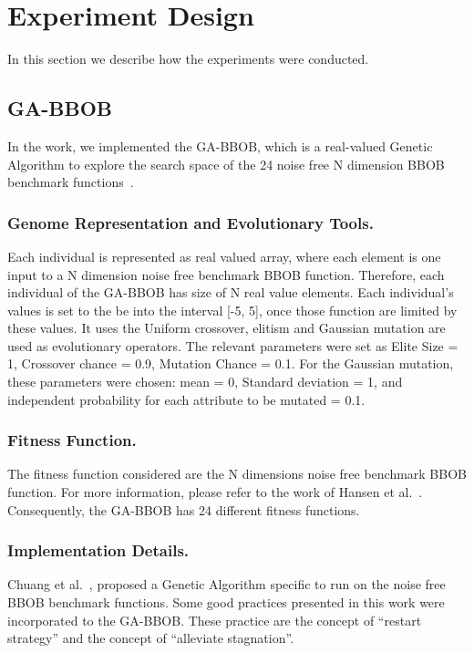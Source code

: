 \section{Experiment Design}

In this section we describe how the experiments were conducted.


\subsection{GA-BBOB}\label{sec:proposed:ga-bbob}

In the work, we implemented the GA-BBOB, which is a real-valued Genetic Algorithm to explore the search space of the 24 noise free N dimension BBOB benchmark functions~\cite{hansen2010real}.

\subsubsection*{Genome Representation and Evolutionary Tools.}
Each individual is represented as real valued array, where each element is one input to a N dimension noise free benchmark BBOB function. Therefore, each individual of the GA-BBOB has size of N real value elements. Each individual's values is set to the be into the interval [-5, 5], once those function are limited by these values. It uses the Uniform crossover, elitism and Gaussian mutation are used as evolutionary operators. The relevant parameters were set as Elite Size = 1, Crossover chance = 0.9, Mutation Chance = 0.1. For the Gaussian mutation, these parameters were chosen: mean = 0, Standard deviation = 1, and independent probability for each attribute to be mutated = 0.1.


\subsubsection*{Fitness Function.}
The fitness function considered are the N dimensions noise free benchmark BBOB function. For more information, please refer to the work of Hansen et al.~\cite{hansen2010real}.
Consequently, the GA-BBOB has 24 different fitness functions. 


\subsubsection*{Implementation Details.}
Chuang et al.~\cite{chuang2012black}, proposed a Genetic Algorithm specific to run on the noise free BBOB benchmark functions. Some good practices presented in this work were incorporated to the GA-BBOB. These practice are the concept of ``restart strategy'' and the concept of ``alleviate stagnation''.

